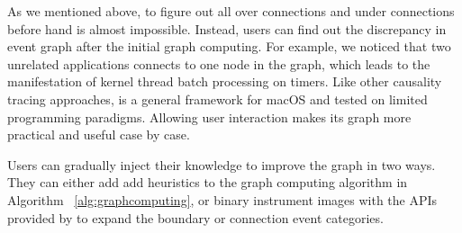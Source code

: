 As we mentioned above, to figure out all over connections and under connections
before hand is almost impossible. Instead, users can find out the discrepancy
in event graph after the initial graph computing. For example, we noticed that
two unrelated applications connects to one node in the graph, which leads to the
manifestation of kernel thread batch processing on timers. Like other causality
tracing approaches, \xxx is a general framework for macOS and tested on limited
programming paradigms. Allowing user interaction makes its graph more practical
and useful case by case.

Users can gradually inject their knowledge to improve the graph in two ways.
They can either add add heuristics to the graph computing algorithm in Algorithm
~\ref{alg:graphcomputing}, or binary instrument images with the APIs provided by
\xxx to expand the boundary or connection event categories.
